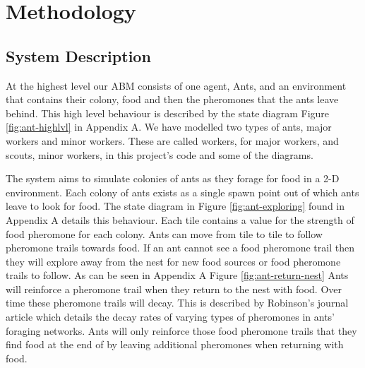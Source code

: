  \section{Methodology}
 
 
 
\subsection{System Description}
 
At the highest level our ABM consists of one agent, Ants, and an environment that contains their colony, food and then the pheromones that the ants leave behind. This high level behaviour is described by the state diagram Figure \ref{fig:ant-highlvl} in Appendix A. We have modelled two types of ants, major workers and minor workers. These are called workers, for major workers, and scouts, minor workers, in this project's code and some of the diagrams.\par
The system aims to simulate colonies of ants as they forage for food in a 2-D environment. Each colony of ants exists as a single spawn point out of which ants leave to look for food. The state diagram in Figure \ref{fig:ant-exploring} found in Appendix A details this behaviour. Each tile contains a value for the strength of food pheromone for each colony. Ants can move from tile to tile to follow pheromone trails towards food. If an ant cannot see a food pheromone trail then they will explore away from the nest for new food sources or food pheromone trails to follow. As can be seen in Appendix A Figure \ref{fig:ant-return-nest} Ants will reinforce a pheromone trail when they return to the nest with food. Over time these pheromone trails will decay. This is described by Robinson's journal article \cite{Robinson2008} which details the decay rates of varying types of pheromones in ants' foraging networks. Ants will only reinforce those food pheromone trails that they find food at the end of by leaving additional pheromones when returning with food.\par

